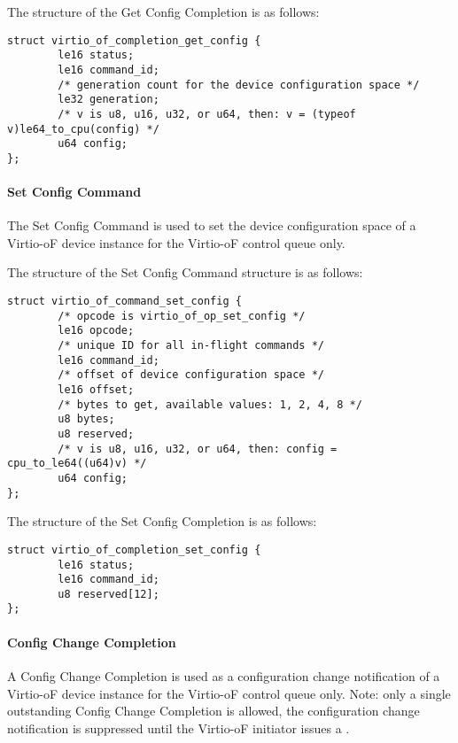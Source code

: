 The structure of the Get Config Completion is as follows:
\begin{lstlisting}
struct virtio_of_completion_get_config {
        le16 status;
        le16 command_id;
        /* generation count for the device configuration space */
        le32 generation;
        /* v is u8, u16, u32, or u64, then: v = (typeof v)le64_to_cpu(config) */
        u64 config;
};
\end{lstlisting}

\paragraph{Set Config Command}\label{sec:Virtio Transport Options / Virtio Over Fabrics / Commands Definition / Opcodes / Set Config Command}
The Set Config Command is used to set the device configuration space of a Virtio-oF device instance for the Virtio-oF control queue only.

The structure of the Set Config Command structure is as follows:
\begin{lstlisting}
struct virtio_of_command_set_config {
        /* opcode is virtio_of_op_set_config */
        le16 opcode;
        /* unique ID for all in-flight commands */
        le16 command_id;
        /* offset of device configuration space */
        le16 offset;
        /* bytes to get, available values: 1, 2, 4, 8 */
        u8 bytes;
        u8 reserved;
        /* v is u8, u16, u32, or u64, then: config = cpu_to_le64((u64)v) */
        u64 config;
};
\end{lstlisting}

The structure of the Set Config Completion is as follows:
\begin{lstlisting}
struct virtio_of_completion_set_config {
        le16 status;
        le16 command_id;
        u8 reserved[12];
};
\end{lstlisting}

\paragraph{Config Change Completion}\label{sec:Virtio Transport Options / Virtio Over Fabrics / Commands Definition / Opcodes / Config Change Completion}
A Config Change Completion is used as a configuration change notification of a Virtio-oF device instance for the Virtio-oF control queue only.
Note: only a single outstanding Config Change Completion is allowed, the configuration change notification is suppressed until the Virtio-oF initiator issues a
.


